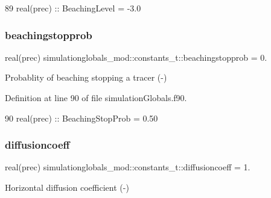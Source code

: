 \begin{DoxyCode}
89         \textcolor{keywordtype}{real(prec)}   :: BeachingLevel = -3.0
\end{DoxyCode}
\mbox{\label{structsimulationglobals__mod_1_1constants__t_a4f4f1254678f9c76367b50991561e9dd}} 
\subsubsection{\texorpdfstring{beachingstopprob}{beachingstopprob}}
{\footnotesize\ttfamily real(prec) simulationglobals\+\_\+mod\+::constants\+\_\+t\+::beachingstopprob = 0.\hspace{0.3cm}{\ttfamily [private]}}



Probablity of beaching stopping a tracer (-\/) 



Definition at line 90 of file simulation\+Globals.\+f90.


\begin{DoxyCode}
90         \textcolor{keywordtype}{real(prec)}   :: BeachingStopProb = 0.50
\end{DoxyCode}
\mbox{\label{structsimulationglobals__mod_1_1constants__t_aa6904a27e36c7a47b9ea105741552025}} 
\subsubsection{\texorpdfstring{diffusioncoeff}{diffusioncoeff}}
{\footnotesize\ttfamily real(prec) simulationglobals\+\_\+mod\+::constants\+\_\+t\+::diffusioncoeff = 1.\hspace{0.3cm}{\ttfamily [private]}}



Horizontal diffusion coefficient (-\/) 



